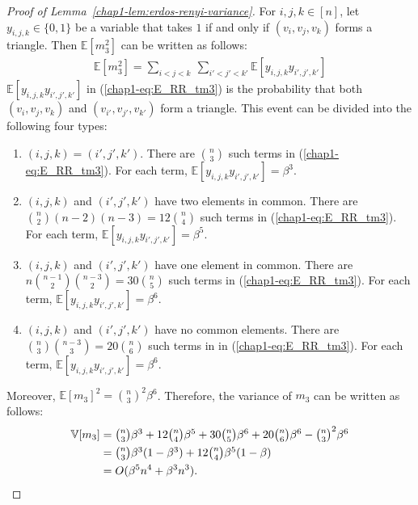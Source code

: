 {\begin{proof}[Proof of Lemma~\ref{chap1-lem:erdos-renyi-variance}]
For $i,j,k \in [n]$, let $y_{i,j,k} \in \{0,1\}$ be a variable that takes $1$ if and only if 
$(v_i, v_j, v_k)$ forms a triangle. 
Then $\mathbb{E}[m_3^2]$ can be written as follows:
\begin{align}
  \mathbb{E}[m_3^2] = \sum_{i<j<k} ~ \sum_{i'<j'<k'}
  \mathbb{E}[y_{i,j,k} y_{i',j',k'}] 
  \label{chap1-eq:E_RR_tm3}
\end{align}
$\mathbb{E}[y_{i,j,k} y_{i',j',k'}]$ in (\ref{chap1-eq:E_RR_tm3}) is the probability that both $(v_i,v_j,v_k)$ and $(v_{i'},v_{j'},v_{k'})$ form a triangle. 
This event can be divided into the following four types:
\begin{enumerate}
\item $(i,j,k)=(i',j',k')$. There are $\binom{n}{3}$ such terms in (\ref{chap1-eq:E_RR_tm3}). 
For each term, $\mathbb{E}[y_{i,j,k} y_{i',j',k'}] = \beta^3$.
\item $(i,j,k)$ and $(i',j',k')$ have two elements in common. 
There are $\binom{n}{2} (n-2) (n-3) = 12\binom{n}{4}$ such terms in (\ref{chap1-eq:E_RR_tm3}). 
For each term, $\mathbb{E}[y_{i,j,k} y_{i',j',k'}] = \beta^5$. 
\item $(i,j,k)$ and $(i',j',k')$ have one element in common. 
There are $n \binom{n-1}{2} \binom{n-3}{2} = 30\binom{n}{5}$ such terms in (\ref{chap1-eq:E_RR_tm3}). 
For each term, $\mathbb{E}[y_{i,j,k} y_{i',j',k'}] = \beta^6$. 
\item $(i,j,k)$ and $(i',j',k')$ have no common elements. 
There are $\binom{n}{3} \binom{n-3}{3} = 20\binom{n}{6}$ such terms in in (\ref{chap1-eq:E_RR_tm3}). 
For each term, $\mathbb{E}[y_{i,j,k} y_{i',j',k'}] = \beta^6$. 
\end{enumerate}
Moreover, $\mathbb{E}[m_3]^2 = \binom{n}{3}^2 \beta^6$. 
Therefore, the variance of $m_3$ can be written as follows:
\begin{align*}
    \mathbb{V}[m_3] 
    &= \textstyle{\binom{n}{3} \beta^3 + 12\binom{n}{4} \beta^5 + 30\binom{n}{5} \beta^6 + 20\binom{n}{6} \beta^6 - \binom{n}{3}^2 \beta^6} \\
    &= \textstyle{\binom{n}{3} \beta^3 (1-\beta^3) + 12\binom{n}{4}\beta^5(1-\beta)} \\
    &= O(\beta^5 n^4 + \beta^3 n^3).
\end{align*}


\end{proof}}
